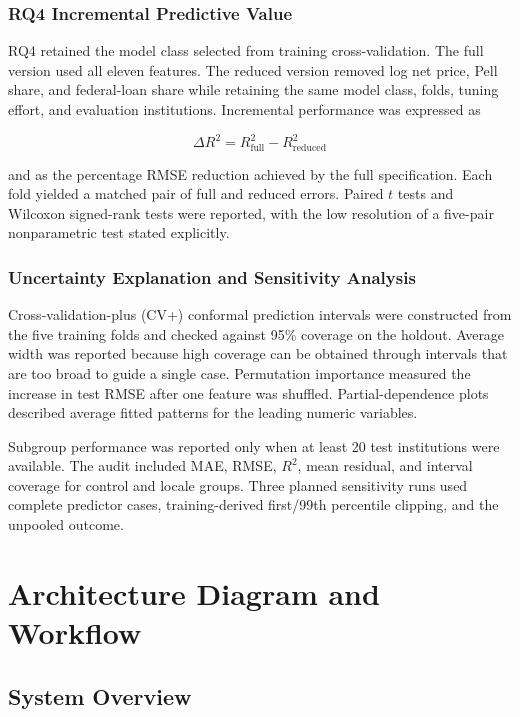 \documentclass[12pt,a4paper]{article}
\newcommand{\sourcecode}[1]{\texttt{\detokenize{#1}}}
\newcommand{\Rtwo}{\ensuremath{R^{2}}}
\begin{document}
\subsubsection{RQ4 Incremental Predictive Value}

RQ4 retained the model class selected from training cross-validation. The full version used all eleven features. The reduced version removed log net price, Pell share, and federal-loan share while retaining the same model class, folds, tuning effort, and evaluation institutions. Incremental performance was expressed as

\begin{equation}
\Delta R^2=R^2_{\text{full}}-R^2_{\text{reduced}}
\end{equation}

and as the percentage RMSE reduction achieved by the full specification. Each fold yielded a matched pair of full and reduced errors. Paired $t$ tests and Wilcoxon signed-rank tests were reported, with the low resolution of a five-pair nonparametric test stated explicitly.

\subsubsection{Uncertainty Explanation and Sensitivity Analysis}

Cross-validation-plus (CV+) conformal prediction intervals were constructed from the five training folds and checked against 95\% coverage on the holdout. Average width was reported because high coverage can be obtained through intervals that are too broad to guide a single case. Permutation importance measured the increase in test RMSE after one feature was shuffled. Partial-dependence plots described average fitted patterns for the leading numeric variables.

Subgroup performance was reported only when at least 20 test institutions were available. The audit included MAE, RMSE, \Rtwo, mean residual, and interval coverage for control and locale groups. Three planned sensitivity runs used complete predictor cases, training-derived first/99th percentile clipping, and the unpooled \sourcecode{C150_4} outcome.

\section{Architecture Diagram and Workflow}

\subsection{System Overview}
\end{document}
